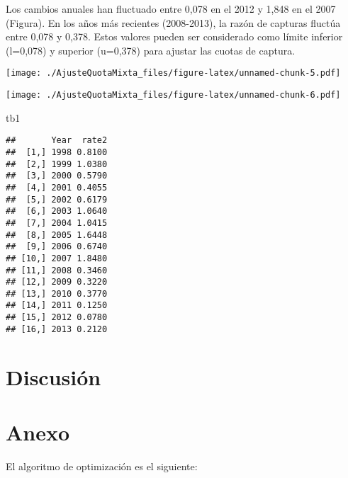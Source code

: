 \documentclass[]{article}
\newenvironment{Shaded}{\begin{snugshade}}{\end{snugshade}}
\newcommand{\KeywordTok}[1]{\textcolor[rgb]{0.13,0.29,0.53}{\textbf{{#1}}}}
\newcommand{\DecValTok}[1]{\textcolor[rgb]{0.00,0.00,0.81}{{#1}}}
\newcommand{\StringTok}[1]{\textcolor[rgb]{0.31,0.60,0.02}{{#1}}}
\newcommand{\NormalTok}[1]{{#1}}
\begin{document}
Los cambios anuales han fluctuado entre 0,078 en el 2012 y 1,848 en el
2007 (Figura). En los años más recientes (2008-2013), la razón de
capturas fluctúa entre 0,078 y 0,378. Estos valores pueden ser
considerado como límite inferior (l=0,078) y superior (u=0,378) para
ajustar las cuotas de captura.

\texttt{[image: ./AjusteQuotaMixta\_files/figure-latex/unnamed-chunk-5.pdf]}

\texttt{[image: ./AjusteQuotaMixta\_files/figure-latex/unnamed-chunk-6.pdf]}

\begin{Shaded}
\begin{Highlighting}[]
\NormalTok{tb1}
\end{Highlighting}
\end{Shaded}

\begin{verbatim}
##       Year  rate2
##  [1,] 1998 0.8100
##  [2,] 1999 1.0380
##  [3,] 2000 0.5790
##  [4,] 2001 0.4055
##  [5,] 2002 0.6179
##  [6,] 2003 1.0640
##  [7,] 2004 1.0415
##  [8,] 2005 1.6448
##  [9,] 2006 0.6740
## [10,] 2007 1.8480
## [11,] 2008 0.3460
## [12,] 2009 0.3220
## [13,] 2010 0.3770
## [14,] 2011 0.1250
## [15,] 2012 0.0780
## [16,] 2013 0.2120
\end{verbatim}

\section{Discusión}\label{discusion}

\section{Anexo}\label{anexo}

El algoritmo de optimización es el siguiente:

\begin{Shaded}
\end{Shaded}
\end{document}
